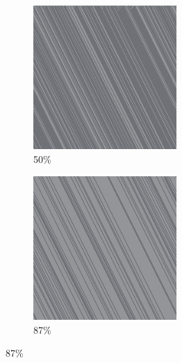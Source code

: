 \documentclass[12pt, fleqn]{report}                             %
\theoremstyle{break}                                            %
\begin{document}
\begin{figure}[ht!]
\begin{subfigure}[b]{0.4\linewidth}
          \includegraphics[width=0.6\textwidth]{Images/35/c.png}
          \caption{50\%}
        \end{subfigure}
        \begin{subfigure}[b]{0.4\linewidth}
          \includegraphics[width=0.6\textwidth]{Images/35/d.png}
          \caption{87\%}
        \end{subfigure}
      \end{figure}
\end{document}
